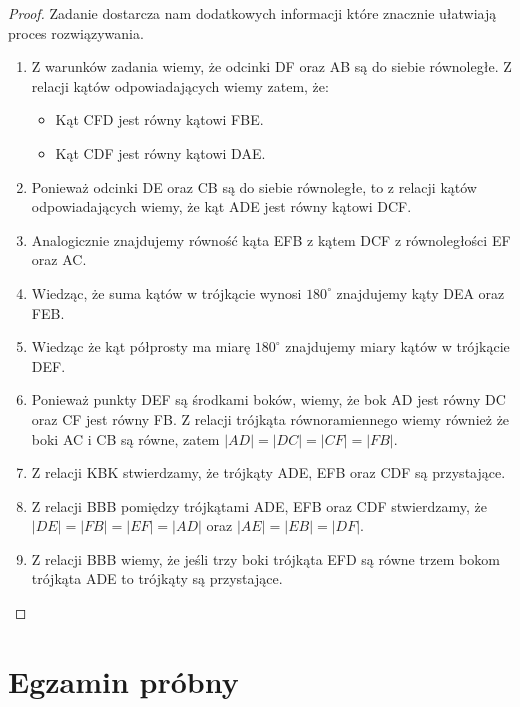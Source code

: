 \documentclass[11pt]{article}
\theoremstyle{definition}
\numberwithin{zad}{section}
\begin{document}
\begin{proof}

Zadanie dostarcza nam dodatkowych informacji które znacznie ułatwiają proces rozwiązywania.
\begin{enumerate}
\item Z warunków zadania wiemy, że odcinki DF oraz AB są do siebie równoległe. Z relacji kątów odpowiadających wiemy zatem, że:
\begin{itemize}
\item Kąt CFD jest równy kątowi FBE.
\item Kąt CDF jest równy kątowi DAE.
\end{itemize}
\item Ponieważ odcinki DE oraz CB są do siebie równoległe, to z relacji kątów odpowiadających wiemy, że kąt ADE jest równy kątowi DCF. 
\item Analogicznie znajdujemy równość kąta EFB z kątem DCF z równoległości EF oraz AC.
\item Wiedząc, że suma kątów w trójkącie wynosi $180^\circ$ znajdujemy kąty DEA oraz FEB.
\item Wiedząc że kąt półprosty ma miarę $180^\circ$ znajdujemy miary kątów w trójkącie DEF.
\item Ponieważ punkty DEF są środkami boków, wiemy, że bok AD jest równy DC oraz CF jest równy FB. Z relacji trójkąta równoramiennego wiemy również że boki AC i CB są równe, zatem $|AD|=|DC|=|CF|=|FB|$.
\item Z relacji KBK stwierdzamy, że trójkąty ADE, EFB oraz CDF są przystające.
\item Z relacji BBB pomiędzy trójkątami ADE, EFB oraz CDF stwierdzamy, że $|DE| = |FB| = |EF| = |AD|$ oraz $|AE|=|EB|=|DF|$.
\item Z relacji BBB wiemy, że jeśli trzy boki trójkąta EFD są równe trzem bokom trójkąta ADE to trójkąty są przystające.
\end{enumerate}
\end{proof}

\newpage
\section{Egzamin próbny}

\newcommand\cke[1]{
\begin{figure}[h]

\end{figure}
\newpage
}
\end{document}
